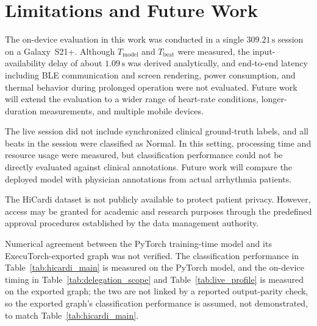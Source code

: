 \section{Limitations and Future Work} \label{sec:conclusion_limitations}
 
The on-device evaluation in this work was conducted in a single $309.21\,\mathrm{s}$ session on a Galaxy~S21+.
Although $T_{\mathrm{model}}$ and $T_{\mathrm{beat}}$ were measured, the input-availability delay of about $1.09\,\mathrm{s}$ was derived analytically, and end-to-end latency including BLE communication and screen rendering, power consumption, and thermal behavior during prolonged operation were not evaluated.
Future work will extend the evaluation to a wider range of heart-rate conditions, longer-duration measurements, and multiple mobile devices.
 
The live session did not include synchronized clinical ground-truth labels, and all beats in the session were classified as Normal.
In this setting, processing time and resource usage were measured, but classification performance could not be directly evaluated against clinical annotations.
Future work will compare the deployed model with physician annotations from actual arrhythmia patients.
 
The HiCardi dataset is not publicly available to protect patient privacy.
However, access may be granted for academic and research purposes through the predefined approval procedures established by the data management authority.

Numerical agreement between the PyTorch training-time model and its ExecuTorch-exported graph was not verified. The classification performance in Table~\ref{tab:hicardi_main} is measured on the PyTorch model, and the on-device timing in Table~\ref{tab:delegation_scope} and Table~\ref{tab:live_profile} is measured on the exported graph; the two are not linked by a reported output-parity check, so the exported graph's classification performance is assumed, not demonstrated, to match Table~\ref{tab:hicardi_main}.
\clearpage
